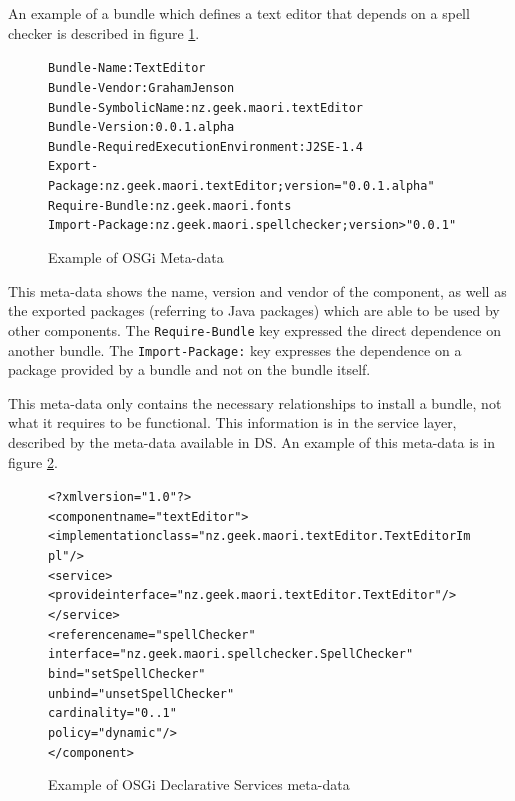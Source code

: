 An example of a bundle which defines a text editor that depends on a spell checker is described in figure \ref{osgibundle}.

\begin{figure}[htp]
\begin{center}
\begin{alltt}
Bundle-Name: TextEditor
Bundle-Vendor: Graham Jenson
Bundle-SymbolicName: nz.geek.maori.textEditor
Bundle-Version: 0.0.1.alpha
Bundle-RequiredExecutionEnvironment: J2SE-1.4
Export-Package: nz.geek.maori.textEditor;version="0.0.1.alpha"
Require-Bundle: nz.geek.maori.fonts
Import-Package: nz.geek.maori.spellchecker;version>"0.0.1"
\end{alltt}
  \caption[OSGi Meta-data]{Example of OSGi Meta-data}
  \label{osgibundle}
\end{center}
\end{figure}

This meta-data shows the name, version and vendor of the component, as well as the exported packages (referring to Java packages) which are able to be used by other components.
The \verb+Require-Bundle+ key expressed the direct dependence on another bundle.
The \verb+Import-Package:+ key expresses the dependence on a package provided by a bundle and not on the bundle itself.

This meta-data only contains the necessary relationships to install a bundle, not what it requires to be functional.
This information is in the service layer, described by the meta-data available in DS.
An example of this meta-data is in figure \ref{dsmetadata}.

\begin{figure}[htp]
\begin{center}
\begin{alltt}
<?xml version="1.0"?>
<component name="textEditor">
    <implementation class="nz.geek.maori.textEditor.TextEditorImpl"/>
    <service>
        <provide interface="nz.geek.maori.textEditor.TextEditor"/>
    </service>
    <reference name="spellChecker"
        interface="nz.geek.maori.spellchecker.SpellChecker"
        bind="setSpellChecker"
        unbind="unsetSpellChecker"
        cardinality="0..1"
        policy="dynamic"/>
</component>
\end{alltt}
  \caption[OSGi Declarative Services]{Example of OSGi Declarative Services meta-data}
  \label{dsmetadata}
\end{center}
\end{figure}


